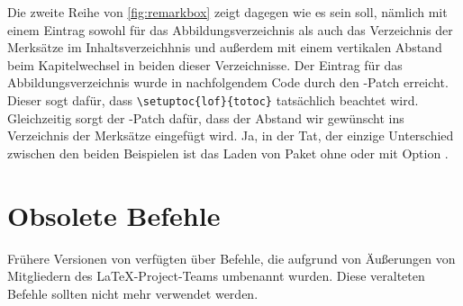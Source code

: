 \begin{Example}
  Die zweite Reihe von \autoref{fig:remarkbox} zeigt dagegen wie es sein soll,
  nämlich mit einem Eintrag sowohl für das Abbildungsverzeichnis als auch das
  Verzeichnis der Merksätze im Inhaltsverzeichhnis und außerdem mit einem
  vertikalen Abstand beim Kapitelwechsel in beiden dieser Verzeichnisse. Der
  Eintrag für das Abbildungsverzeichnis wurde in nachfolgendem Code durch den
  -Patch erreicht. Dieser sogt dafür, dass
  \verb|\setuptoc{lof}{totoc}| tatsächlich beachtet wird. Gleichzeitig sorgt
  der -Patch dafür, dass der Abstand wir gewünscht ins
  Verzeichnis der Merksätze eingefügt wird.%
  Ja, in der Tat, der einzige Unterschied zwischen den beiden Beispielen ist
  das Laden von Paket  ohne oder mit Option
  .%
\end{Example}%
\EndIndexGroup
\ExampleEndFix

\section{Obsolete Befehle}

Frühere Versionen von  verfügten über Befehle,
die aufgrund von Äußerungen von Mitgliedern des \LaTeX-Project-Teams umbenannt
wurden. Diese veralteten Befehle sollten nicht mehr verwendet werden.

%
%
\EndIndexGroup

\endinput


